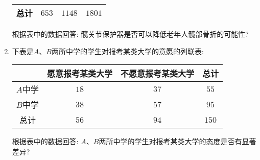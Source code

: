 \documentclass[10pt,a4paper]{article}
\begin{document}
\begin{enumerate}[1.]
\begin{center}
\begin{tabular}{|c|c|c|c|}
总计 & $653$ & $1148$ & $1801$ \\ \hline
\end{tabular}
\end{center}
根据表中的数据回答: 髋关节保护器是否可以降低老年人髋部骨折的可能性?
\item 下表是$A$、$B$两所中学的学生对报考某类大学的意愿的列联表:
\begin{center}
\begin{tabular}{|c|c|c|c|}
\hline
& 愿意报考某类大学 & 不愿意报考某类大学 & 总计 \\ \hline
$A$中学 & $18$ & $37$ & $55$ \\ \hline
$B$中学 & $38$ & $57$ & $95$ \\ \hline
总计 & $56$ & $94$ & $150$ \\ \hline
\end{tabular}
\end{center}
根据表中的数据回答: $A$、$B$两所中学的学生对报考某类大学的态度是否有显著差异?
 
\end{enumerate}
\end{document}

